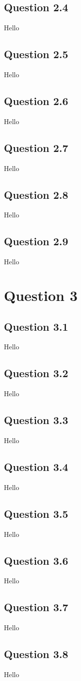 \documentclass[parskip=full]{scrartcl}
\begin{document}
    \subsection*{Question 2.4}
    Hello
    \subsection*{Question 2.5}
    Hello
    \subsection*{Question 2.6}
    Hello
    \subsection*{Question 2.7}
    Hello
    \subsection*{Question 2.8}
    Hello
    \subsection*{Question 2.9}
    Hello
    
\section*{Question 3}
    \subsection*{Question 3.1}
    Hello
    \subsection*{Question 3.2}
    Hello
    \subsection*{Question 3.3}
    Hello
    \subsection*{Question 3.4}
    Hello
    \subsection*{Question 3.5}
    Hello
    \subsection*{Question 3.6}
    Hello
    \subsection*{Question 3.7}
    Hello
    \subsection*{Question 3.8}
    Hello
    
\end{document}
